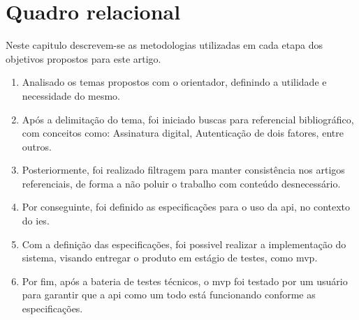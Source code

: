 \section{Quadro relacional}
Neste capitulo descrevem-se as metodologias utilizadas em cada etapa dos objetivos propostos para este artigo.

\newcommand{\definicaoTema}{
\item Analisado os temas propostos com o orientador, definindo a utilidade e necessidade do mesmo.
}

\newcommand{\buscaArtigos}{
    \item Após a delimitação do tema, foi iniciado buscas para referencial bibliográfico, com conceitos como: Assinatura digital, Autenticação de dois fatores, entre outros.
}

\newcommand{\filtragemArtigos}{
\item Posteriormente, foi realizado filtragem para manter consistência nos artigos referenciais, de forma a não poluir o trabalho com conteúdo desnecessário.
}

\newcommand{\definicaoEspecificacoes}{
 \item Por conseguinte, foi definido as especificações para o uso da \acrshort{api}, no contexto do \acrfull{ies}.
}

\newcommand{\implementacaoAPI}{
    \item Com a definição das especificações, foi possivel realizar a implementação do sistema, visando entregar o produto em estágio de testes, como \acrfull{mvp}.
}

\newcommand{\testeAPI}{
    \item Por fim, após a bateria de testes técnicos, o \acrshort{mvp} foi testado por um usuário para garantir que a \acrshort{api} como um todo está funcionando conforme as especificações.
}

\begin{enumerate}[label=\arabic*\textdegree\space Etapa:, leftmargin=2cm]
    \definicaoTema
    \buscaArtigos
    \filtragemArtigos
    \definicaoEspecificacoes
    \implementacaoAPI
    \testeAPI
\end{enumerate}


